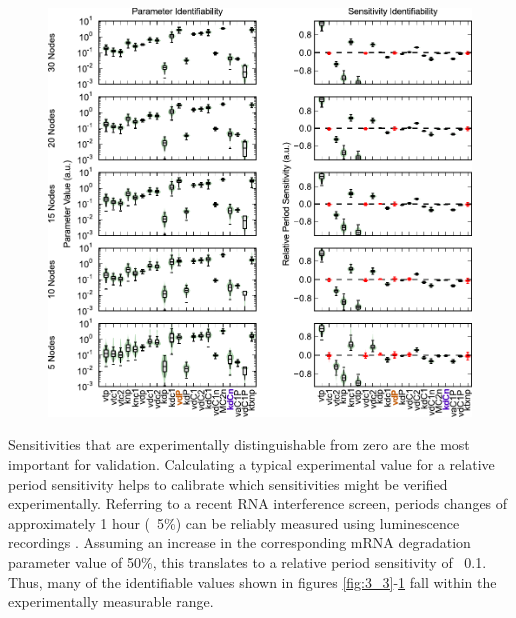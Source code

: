{\begin{figure}[p]
  \centering
  \includegraphics[width=\textwidth]{chap3/figures/fig4.pdf}
  \label{fig:3_4}
\end{figure}

Sensitivities that are experimentally distinguishable from zero are the most important for validation. 
Calculating a typical experimental value for a relative period sensitivity helps to calibrate which sensitivities might be verified experimentally. 
Referring to a recent RNA interference screen, periods changes of approximately 1 hour (~5\%) can be reliably measured using luminescence recordings \cite{Zhang2009}. 
Assuming an increase in the corresponding mRNA degradation parameter value of 50\%, this translates to a relative period sensitivity of ~0.1. 
Thus, many of the identifiable values shown in figures \ref{fig:3_3}-\ref{fig:3_4} fall within the experimentally measurable range. 

}
